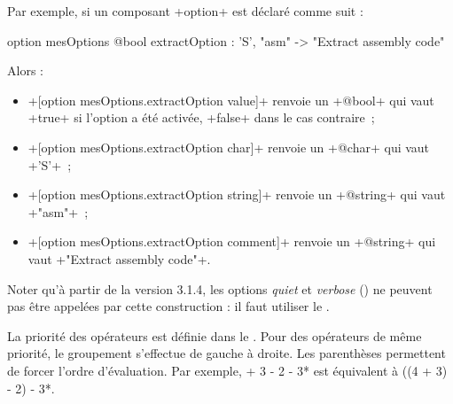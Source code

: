 Par exemple, si un composant \ggsq+option+ est déclaré comme suit :
\begin{galgas4}
option mesOptions {
  @bool extractOption : 'S', "asm" -> "Extract assembly code"
}
\end{galgas4}

Alors :
\begin{itemize}
  \item \ggsq+[option mesOptions.extractOption value]+ renvoie un \ggsq+@bool+ qui vaut \ggsq+true+ si l'option a été activée, \ggsq+false+ dans le cas contraire~;
  \item \ggsq+[option mesOptions.extractOption char]+ renvoie un \ggsq+@char+ qui vaut \ggsq+'S'+~;
  \item \ggsq+[option mesOptions.extractOption string]+ renvoie un \ggsq+@string+ qui vaut \ggsq+"asm"+~;
  \item \ggsq+[option mesOptions.extractOption comment]+ renvoie un \ggsq+@string+ qui vaut \ggsq+"Extract assembly code"+.
\end{itemize}

Noter qu'à partir de la version 3.1.4, les options \emph{quiet} et \emph{verbose} () ne peuvent pas être appelées par cette construction : il faut utiliser le .






La priorité des opérateurs est définie dans le . Pour des opérateurs de même priorité, le groupement s'effectue de gauche à droite. Les parenthèses permettent de forcer l'ordre d'évaluation. Par exemple,  + 3 - 2 - 3* est équivalent à \ggsq*((4 + 3) - 2) - 3*.

